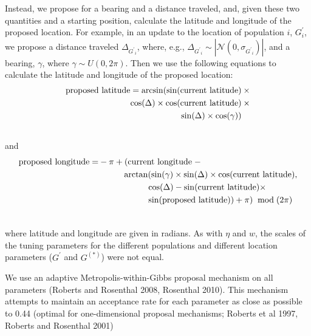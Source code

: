 \documentclass[12pt]{article}
\newcommand{\identifyadmixsource}[1]{{#1^{(*)}}}
\begin{document}
Instead, we propose for a bearing and a distance traveled, and, given these two quantities and a starting position, calculate the latitude and longitude of the proposed location.  For example, in an update to the location of population $i$, $G^{\prime}_i$, we propose a distance traveled $\Delta_{{G^{\prime}}_i}$, where, e.g., $\Delta_{{G^{\prime}}_i}  \sim | \mathcal{N}(0,\sigma_{{G^{\prime}}_i})|$, and a bearing, $\gamma$, where $\gamma \sim U(0,2\pi)$.  Then we use the following equations to calculate the latitude and longitude of the proposed location:
\begin{align}
\text{proposed latitude} = \arcsin(\sin(\text{current latitude}) \: &\times\\  \notag
					\cos(\Delta) \times \cos(\text{current latitude}) \:&\times\\  \notag
					\sin(\Delta) \times \cos(\gamma))   \:&\phantom{\times}\\  \notag
\end{align}
and
\begin{align}
\text{proposed longitude} = & - \pi + (\text{current longitude} \; - \\ \notag
					 	&\hspace{1cm} \arctan(
							\sin(\gamma) \times
							\sin(\Delta) \times
							\cos(\text{current latitude}) , \\ \notag
						& \hspace{2cm} \cos(\Delta) - 
							\sin(\text{current latitude}) \times \\ \notag
						& \hspace{2cm} \sin(\text{proposed latitude})) + \pi) \; \bmod (2\pi) \\ \notag
\end{align}

where latitude and longitude are given in radians.  As with $\eta$ and $w$, the scales of the tuning parameters for the different populations and different location parameters ($G^{\prime}$ and $\identifyadmixsource{G}$) were not equal.

We use an adaptive Metropolis-within-Gibbs proposal mechanism on all parameters (Roberts and Rosenthal 2008, Rosenthal 2010).  This mechanism attempts to maintain an acceptance rate for each parameter as close as possible to 0.44 (optimal for one-dimensional proposal mechanisms; Roberts et al 1997, Roberts and Rosenthal 2001)






\end{document}
